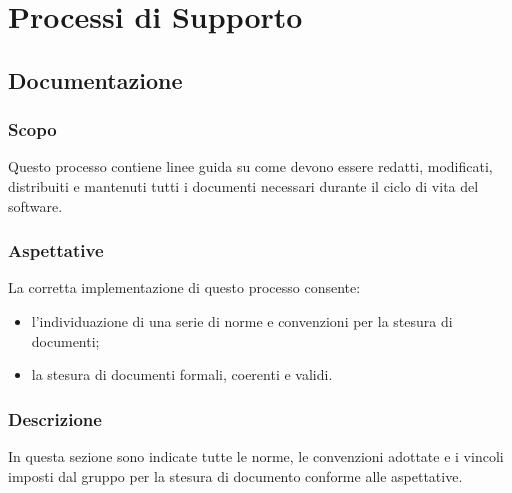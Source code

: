 \section{Processi di Supporto}
    \subsection{Documentazione}
        \subsubsection{Scopo}
        Questo processo contiene linee guida su come devono essere redatti, modificati, distribuiti 
        e mantenuti tutti i documenti necessari durante il ciclo di vita del software.
        
        \subsubsection{Aspettative}
        La corretta implementazione di questo processo consente:
            \begin{itemize}
                \item l'individuazione di una serie di norme e convenzioni per la stesura di documenti;
                \item la stesura di documenti formali, coerenti e validi.
            \end{itemize}
        
        \subsubsection{Descrizione}
            In questa sezione sono indicate tutte le norme, le convenzioni adottate e i vincoli imposti 
            dal gruppo per la stesura di documento conforme alle aspettative.

